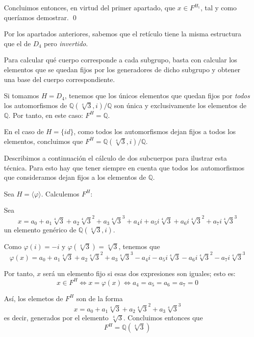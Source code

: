 \documentclass[a4paper, 11pt]{article}
\begin{document}
\begin{solucion}
\begin{apartado}
          Concluimos entonces, en virtud del primer apartado, que $x \in F^{H_1}$, tal y como queríamos demostrar. \qed
      \end{apartado}

      \begin{apartado}
          Por los apartados anteriores, sabemos que el retículo tiene la misma estructura que el de $D_4$ pero \emph{invertido}.

          Para calcular qué cuerpo corresponde a cada subgrupo, basta con calcular los elementos que se quedan fijos por los generadores de dicho subgrupo y obtener una base del cuerpo correspondiente.

          Si tomamos $H = D_4$, tenemos que los únicos elementos que quedan fijos por \emph{todos} los automorfismos de $\mathbb{Q}(\sqrt[4]{3},i)/\mathbb{Q}$ son única y exclusivamente los elementos de $\mathbb{Q}$. Por tanto, en este caso: $F^H = \mathbb{Q}$.

          En el caso de $H = \{id\}$, como todos los automorfismos dejan fijos a todos los elementos, concluimos que $F^H = \mathbb{Q}(\sqrt[4]{3},i)/\mathbb{Q}$.

          Describimos a continuación el cálculo de dos subcuerpos para ilustrar esta técnica. Para esto hay que tener siempre en cuenta que todos los automorfismos que consideramos dejan fijos a los elementos de $\mathbb{Q}$.

          Sea $H=\langle \varphi \rangle$. Calculemos $F^H$:

          Sea
          \[
          x = a_0 + a_1 \sqrt[4]{3} + a_2 \sqrt[4]{3}^2 + a_3 \sqrt[4]{3}^3 + a_4 i + a_5 i \sqrt[4]{3} + a_6 i \sqrt[4]{3}^2 + a_7 i \sqrt[4]{3}^3
          \]
          un elemento genérico de $\mathbb{Q}(\sqrt[4]{3},i)$.

          Como $\varphi(i)=-i$ y $\varphi(\sqrt[4]{3})=\sqrt[4]{3}$, tenemos que
          \[
          \varphi(x) = a_0 + a_1 \sqrt[4]{3} + a_2 \sqrt[4]{3}^2 + a_3 \sqrt[4]{3}^3 - a_4 i - a_5 i \sqrt[4]{3} - a_6 i \sqrt[4]{3}^2 - a_7 i \sqrt[4]{3}^3
          \]

          Por tanto, $x$ será un elemento fijo si esas dos expresiones son iguales; esto es:
          \[
          x \in F^H \iff x = \varphi(x) \iff a_4 = a_5 = a_6 = a_7 = 0
          \]

          Así, los elemetos de $F^H$ son de la forma
          \[
          x = a_0 + a_1 \sqrt[4]{3} + a_2 \sqrt[4]{3}^2 + a_3 \sqrt[4]{3}^3
          \]
          es decir, generados por el elemento $\sqrt[4]{3}$. Concluimos entonces que \[F^H = \mathbb{Q}(\sqrt[4]{3})\]


\end{apartado}
\end{solucion}
\end{document}
